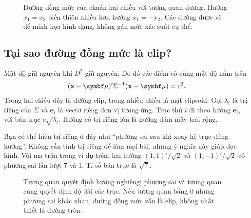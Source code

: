 \begin{figure}[htbp]
\centering
{}
\caption{Đường đồng mức của chuẩn hai chiều với tương quan dương.
Hướng $x_1=x_2$ biến thiên nhiều hơn hướng $x_1=-x_2$. Các đường được vẽ
để minh họa hình dạng, không gán mức xác suất cụ thể.}
\label{fig:correlation}
\end{figure}

\subsection{Tại sao đường đồng mức là elip?}
Mật độ giữ nguyên khi $D^2$ giữ nguyên. Do đó các điểm có cùng mật độ nằm trên
\[
 (\mathbf x-\vmu)'\Sigma^{-1}(\mathbf x-\vmu)=c^2.
\]
Trong hai chiều đây là đường elip, trong nhiều chiều là mặt elipsoid.
Gọi $\lambda_i$ là trị riêng của $\Sigma$ và $\mathbf e_i$ là vectơ riêng
đơn vị tương ứng. Trục thứ $i$ đi theo hướng $\mathbf e_i$, với bán trục
$c\sqrt{\lambda_i}$. Hướng có trị riêng lớn là hướng đám mây trải rộng.

Bạn có thể hiểu trị riêng ở đây như ``phương sai sau khi xoay hệ trục đúng
hướng''. Không cần tính trị riêng để làm mọi bài, nhưng ý nghĩa này giúp đọc hình.
Với ma trận trong ví dụ trên, hai hướng $(1,1)'/\sqrt2$ và $(1,-1)'/\sqrt2$
có phương sai lần lượt 7 và 1. Tỉ số bán trục là $\sqrt7$.

\begin{figure}[htbp]
\centering
{}
\caption{Tương quan quyết định hướng nghiêng; phương sai và tương quan cùng
quyết định độ dài các trục. Nếu tương quan bằng 0 nhưng phương sai khác nhau,
đường đồng mức vẫn là elip, không nhất thiết là đường tròn.}
\end{figure}

